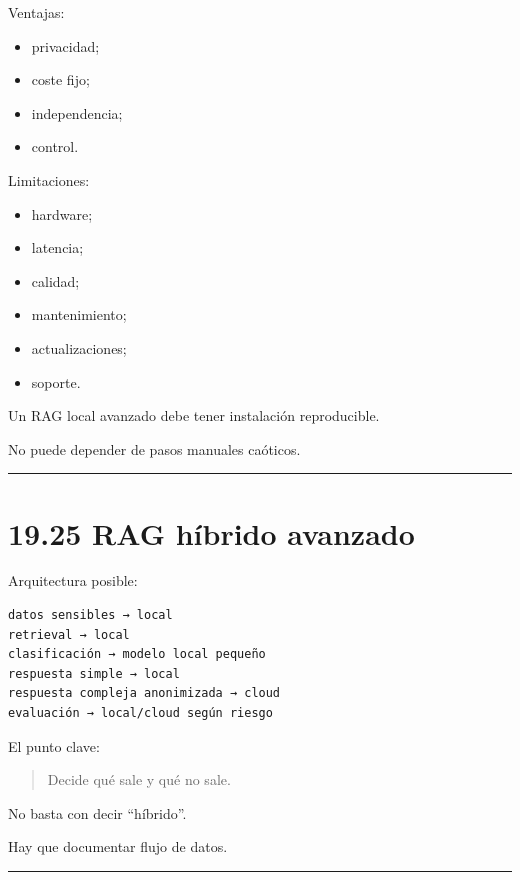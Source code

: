 Ventajas:

\begin{itemize}
\tightlist
\item
  privacidad;
\item
  coste fijo;
\item
  independencia;
\item
  control.
\end{itemize}

Limitaciones:

\begin{itemize}
\tightlist
\item
  hardware;
\item
  latencia;
\item
  calidad;
\item
  mantenimiento;
\item
  actualizaciones;
\item
  soporte.
\end{itemize}

Un RAG local avanzado debe tener instalación reproducible.

No puede depender de pasos manuales caóticos.

\begin{center}\rule{0.5\linewidth}{0.5pt}\end{center}

\section{19.25 RAG híbrido avanzado}\label{rag-huxedbrido-avanzado}

Arquitectura posible:

\begin{lstlisting}
datos sensibles → local
retrieval → local
clasificación → modelo local pequeño
respuesta simple → local
respuesta compleja anonimizada → cloud
evaluación → local/cloud según riesgo
\end{lstlisting}

El punto clave:

\begin{quote}
Decide qué sale y qué no sale.
\end{quote}

No basta con decir ``híbrido''.

Hay que documentar flujo de datos.

\begin{center}\rule{0.5\linewidth}{0.5pt}\end{center}

